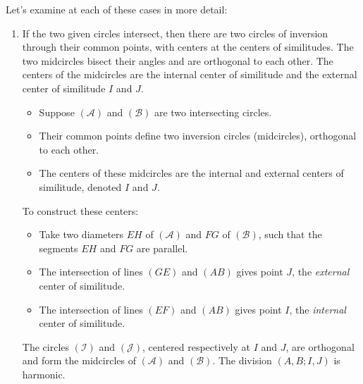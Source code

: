 \vspace{1em}
Let’s examine at each of these cases in more detail:

\begin{enumerate}[label=(\roman*)]
\item If the two given circles intersect, then there are two  circles of inversion through their common points, with centers at the centers of similitudes.  The two midcircles bisect their angles and are orthogonal to each other. The centers of the midcircles are the internal center of similitude and the external center of similitude $I$ and $J$.

\begin{itemize}
  \item Suppose $(\mathcal{A})$ and $(\mathcal{B})$ are two intersecting circles.
  \item Their common points define two inversion circles (midcircles), orthogonal to each other.
  \item The centers of these midcircles are the internal and external centers of similitude, denoted $I$ and $J$.
\end{itemize}

\noindent
To construct these centers:
\begin{itemize}
  \item Take two diameters $EH$ of $(\mathcal{A})$ and $FG$ of $(\mathcal{B})$, such that the segments $EH$ and $FG$ are parallel.
  \item The intersection of lines $(GE)$ and $(AB)$ gives point $J$, the \emph{external} center of similitude.
  \item The intersection of lines $(EF)$ and $(AB)$ gives point $I$, the \emph{internal} center of similitude.
\end{itemize}

\noindent
The circles $(\mathcal{I})$ and $(\mathcal{J})$, centered respectively at $I$ and $J$, are orthogonal and form the midcircles of $(\mathcal{A})$ and $(\mathcal{B})$. The division $(A,B;I,J)$ is harmonic.

\vspace{1em}


\end{enumerate}
